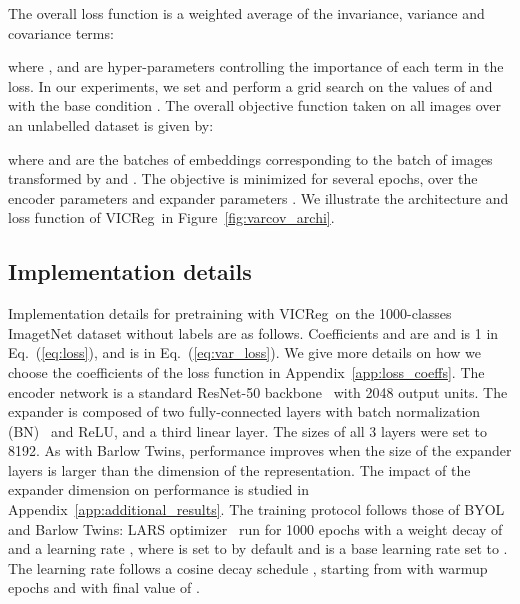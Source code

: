 \documentclass{article}
\newcommand{\algo}{VICReg}
\newcommand{\expander}{expander }
\begin{document}
The overall loss function is a weighted average of the invariance, variance and covariance terms:

where ,  and  are hyper-parameters controlling the importance of each term in the loss. In our experiments, we set  and perform a grid search on the values of  and  with the base condition . The overall objective function taken on all images over an unlabelled dataset  is given by:

where  and  are the batches of embeddings corresponding to the batch of images  transformed by  and . The objective is minimized for several epochs, over the encoder parameters  and \expander parameters . We illustrate the architecture and loss function of \algo \ in Figure~\ref{fig:varcov_archi}.\\
\setlength\intextsep{0pt}
\subsection{Implementation details} \label{sec:impl_details}














Implementation details for pretraining with \algo \ on the 1000-classes ImagetNet dataset without labels are as follows. Coefficients  and  are  and  is 1 in Eq.~(\ref{eq:loss}), and  is  in Eq.~(\ref{eq:var_loss}). We give more details on how we choose the coefficients of the loss function in Appendix~\ref{app:loss_coeffs}. The encoder network  is a standard ResNet-50 backbone~\cite{he2016resnet} with 2048 output units. The expander  is composed of two fully-connected layers with batch normalization (BN)~\cite{ioffe2015bn} and ReLU, and a third linear layer. The sizes of all 3 layers were set to 8192. As with Barlow Twins, performance improves when the size of the expander layers is larger than the dimension of the representation. The impact of the expander dimension on performance is studied in Appendix~\ref{app:additional_results}. The training protocol follows those of BYOL and Barlow Twins: LARS optimizer~\cite{you2017lars, goyal2017lars} run for 1000 epochs with a weight decay of  and a learning rate , where  is set to  by default and  is a base learning rate set to . The learning rate follows a cosine decay schedule \cite{loshchilov2017sgdr}, starting from  with  warmup epochs and with final value of .
\end{document}
